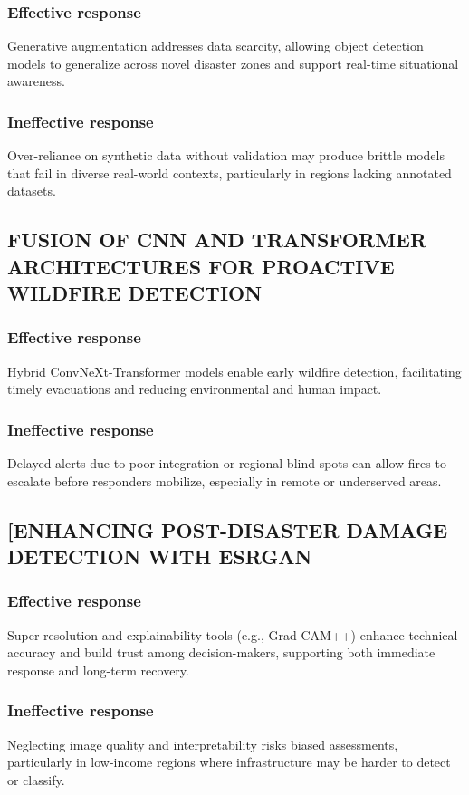 \documentclass[conference,a4paper]{IEEEtran}
\begin{document}
\subsubsection{Effective response}
Generative augmentation addresses data scarcity, allowing object detection models to generalize across novel disaster zones and support real-time situational awareness.
\subsubsection{Ineffective response}
Over-reliance on synthetic data without validation may produce brittle models that fail in diverse real-world contexts, particularly in regions lacking annotated datasets.
\subsection{FUSION OF CNN AND TRANSFORMER ARCHITECTURES FOR PROACTIVE WILDFIRE DETECTION}
\subsubsection{Effective response}
Hybrid ConvNeXt-Transformer models enable early wildfire detection, facilitating timely evacuations and reducing environmental and human impact.
\subsubsection{Ineffective response}
Delayed alerts due to poor integration or regional blind spots can allow fires to escalate before responders mobilize, especially in remote or underserved areas.
\subsection{[ENHANCING POST-DISASTER DAMAGE DETECTION WITH ESRGAN}
\subsubsection{Effective response}
Super-resolution and explainability tools (e.g., Grad-CAM++) enhance technical accuracy and build trust among decision-makers, supporting both immediate response and long-term recovery.
\subsubsection{Ineffective response}
Neglecting image quality and interpretability risks biased assessments, particularly in low-income regions where infrastructure may be harder to detect or classify.
\end{document}
